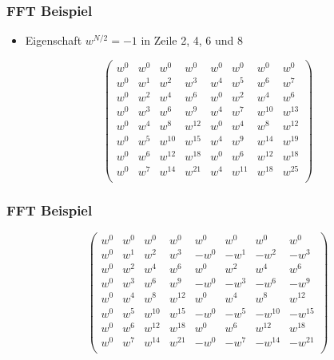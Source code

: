 \frame
{
	\frametitle{FFT Beispiel}
	\begin{itemize}
		\item Eigenschaft $w^{N/2} = -1$ in Zeile 2, 4, 6 und 8
	\end{itemize}
	\vspace{1mm}
	\begin{equation*}
	\left( \begin{array}{cccccccc}
	w^{0} & w^{0} & w^{0} & w^{0} & w^{0} & w^{0} & w^{0} & w^{0}\\
w^{0} & w^{1} & w^{2} & w^{3} & w^{4} & w^{5} & w^{6} & w^{7}\\
w^{0} & w^{2} & w^{4} & w^{6} & w^{0} & w^{2} & w^{4} & w^{6}\\
w^{0} & w^{3} & w^{6} & w^{9} & w^{4} & w^{7} & w^{10} & w^{13}\\
w^{0} & w^{4} & w^{8} & w^{12} & w^{0} & w^{4} & w^{8} & w^{12}\\
w^{0} & w^{5} & w^{10} & w^{15} & w^{4} & w^{9} & w^{14} & w^{19}\\
w^{0} & w^{6} & w^{12} & w^{18} & w^{0} & w^{6} & w^{12} & w^{18}\\
w^{0} & w^{7} & w^{14} & w^{21} & w^{4} & w^{11} & w^{18} & w^{25}\\
	\end{array} \right)
\end{equation*}
}

\frame
{
	\frametitle{FFT Beispiel}
	\begin{equation*}
	\left( \begin{array}{cccccccc}
		w^{0} & w^{0} & w^{0} & w^{0} & w^{0} & w^{0} & w^{0} & w^{0}\\
w^{0} & w^{1} & w^{2} & w^{3} & -w^{0} & -w^{1} & -w^{2} & -w^{3}\\
w^{0} & w^{2} & w^{4} & w^{6} & w^{0} & w^{2} & w^{4} & w^{6}\\
w^{0} & w^{3} & w^{6} & w^{9} & -w^{0} & -w^{3} & -w^{6} & -w^{9}\\
w^{0} & w^{4} & w^{8} & w^{12} & w^{0} & w^{4} & w^{8} & w^{12}\\
w^{0} & w^{5} & w^{10} & w^{15} & -w^{0} & -w^{5} & -w^{10} & -w^{15}\\
w^{0} & w^{6} & w^{12} & w^{18} & w^{0} & w^{6} & w^{12} & w^{18}\\
w^{0} & w^{7} & w^{14} & w^{21} & -w^{0} & -w^{7} & -w^{14} & -w^{21}\\
	\end{array} \right)
\end{equation*}
}

